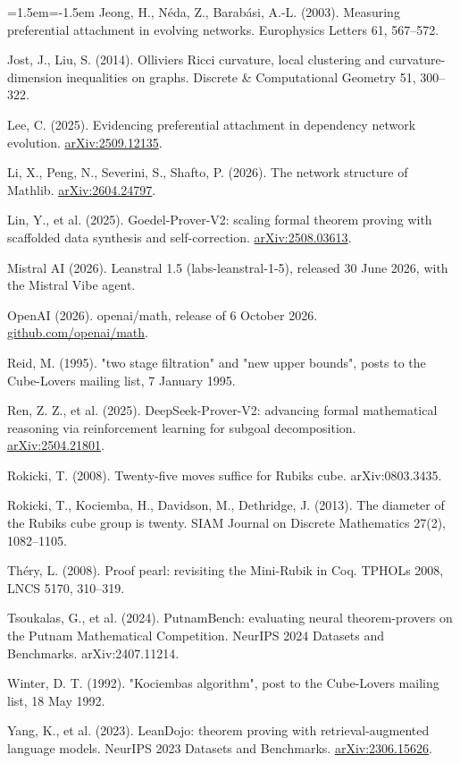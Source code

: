 \documentclass[11pt,a4paper]{article}
\begin{document}
\begin{list}{}{\leftmargin=1.5em\itemindent=-1.5em\itemsep=2pt}
  Jeong, H., Néda, Z., Barabási, A.-L. (2003). Measuring preferential attachment in evolving networks. Europhysics Letters 61, 567--572.
\item
  Jost, J., Liu, S. (2014). Ollivier\textquotesingle s Ricci curvature, local clustering and curvature-dimension inequalities on graphs. Discrete \& Computational Geometry 51, 300--322.
\item
  Lee, C. (2025). Evidencing preferential attachment in dependency network evolution. \href{https://arxiv.org/abs/2509.12135}{arXiv:2509.12135}.
\item
  Li, X., Peng, N., Severini, S., Shafto, P. (2026). The network structure of Mathlib. \href{https://arxiv.org/abs/2604.24797}{arXiv:2604.24797}.
\item
  Lin, Y., et al. (2025). Goedel-Prover-V2: scaling formal theorem proving with scaffolded data synthesis and self-correction. \href{https://arxiv.org/abs/2508.03613}{arXiv:2508.03613}.
\item
  Mistral AI (2026). Leanstral 1.5 (labs-leanstral-1-5), released 30 June 2026, with the Mistral Vibe agent.
\item
  OpenAI (2026). openai/math, release of 6 October 2026. \href{https://github.com/openai/math}{github.com/\allowbreak{}openai/\allowbreak{}math}.
\item
  Reid, M. (1995). "two stage filtration" and "new upper bounds", posts to the Cube-Lovers mailing list, 7 January 1995.
\item
  Ren, Z. Z., et al. (2025). DeepSeek-Prover-V2: advancing formal mathematical reasoning via reinforcement learning for subgoal decomposition. \href{https://arxiv.org/abs/2504.21801}{arXiv:2504.21801}.
\item
  Rokicki, T. (2008). Twenty-five moves suffice for Rubik\textquotesingle s cube. arXiv:0803.3435.
\item
  Rokicki, T., Kociemba, H., Davidson, M., Dethridge, J. (2013). The diameter of the Rubik\textquotesingle s cube group is twenty. SIAM Journal on Discrete Mathematics 27(2), 1082--1105.
\item
  Théry, L. (2008). Proof pearl: revisiting the Mini-Rubik in Coq. TPHOLs 2008, LNCS 5170, 310--319.
\item
  Tsoukalas, G., et al. (2024). PutnamBench: evaluating neural theorem-provers on the Putnam Mathematical Competition. NeurIPS 2024 Datasets and Benchmarks. arXiv:2407.11214.
\item
  Winter, D. T. (1992). "Kociemba\textquotesingle s algorithm", post to the Cube-Lovers mailing list, 18 May 1992.
\item
  Yang, K., et al. (2023). LeanDojo: theorem proving with retrieval-augmented language models. NeurIPS 2023 Datasets and Benchmarks. \href{https://arxiv.org/abs/2306.15626}{arXiv:2306.15626}.
\end{list}
\end{document}

